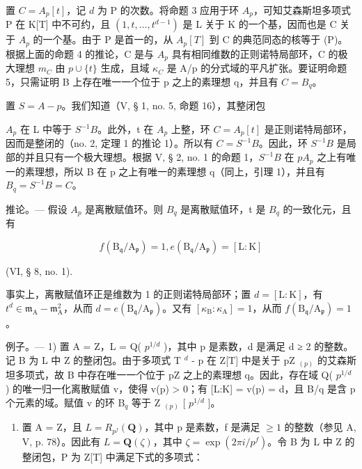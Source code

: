 置 \(C = A_{p}[t]\)，记 \(d\) 为 P 的次数。将命题 3 应用于环 \(A_{p}\)，可知艾森斯坦多项式 P 在 K{[}T{]} 中不可约，且 \((1, t, ..., t^{d-1})\) 是 L 关于 K 的一个基，因而也是 C 关于 \(A_{p}\) 的一个基。由于 P 是首一的，从 \(A_{p}[T]\) 到 C 的典范同态的核等于 (P)。根据上面的命题 4 的推论，C 是与 \(A_{p}\) 具有相同维数的正则诺特局部环，C 的极大理想 \(m_{C}\) 由 \(p \cup \{t\}\) 生成，且域 \(\kappa_{C}\) 是 A/p 的分式域的平凡扩张。要证明命题 5，只需证明 B 上存在唯一一个位于 p 之上的素理想 q，并且有 \(C = B_{q}\)。

置 \(S = A - p\)。我们知道（V, § 1, no. 5, 命题 16），其整闭包

\(A_{p}\) 在 L 中等于 \(S^{-1}B\)。此外，t 在 \(A_{p}\) 上整，环 \(C = A_{p}[t]\) 是正则诺特局部环，因而是整闭的（no. 2, 定理 1 的推论 1）。所以有 \(C = S^{-1}B\)。因此，环 \(S^{-1}B\) 是局部的并且只有一个极大理想。根据 V, § 2, no. 1 的命题 1，\(S^{-1}B\) 在 \(pA_{p}\) 之上有唯一的素理想，所以 B 在 p 之上有唯一的素理想 q（同上，引理 1），并且有 \(B_{q} = S^{-1}B = C\)。

推论。--- 假设 \(A_{p}\) 是离散赋值环。则 \(B_{q}\) 是离散赋值环，t 是 \(B_{q}\) 的一致化元，且有

\[
f (\mathrm{B} _ {\mathfrak {q}} / \mathrm{A} _ {\mathfrak {p}}) = 1, e (\mathrm{B} _ {\mathfrak {q}} / \mathrm{A} _ {\mathfrak {p}}) = [ \mathrm{L}: \mathrm{K} ]\tag{9}
\]

(VI, § 8, no. 1).

事实上，离散赋值环正是维数为 1 的正则诺特局部环；置 \(d = [\mathrm{L}:\mathrm{K}]\)，有 \(t^{d}\in\mathfrak{m}_{\mathrm{A}}-\mathfrak{m}_{\mathrm{A}}^{2}\)，从而 \(d=e(\mathrm{B}_{\mathfrak{q}}/\mathrm{A}_{\mathfrak{p}})\)。又有 \([\kappa_{\mathrm{B}}:\kappa_{\mathrm{A}}]=1\)，从而 \(f(\mathrm{B}_{\mathfrak{q}}/\mathrm{A}_{\mathfrak{p}})=1\)。

例子。--- 1) 置 A = Z，L = Q( \(p^{1/d}\) )，其中 p 是素数，d 是满足 d ≥ 2 的整数。记 B 为 L 中 Z 的整闭包。由于多项式 T \(^{d}\) - p 在 Z{[}T{]} 中是关于 pZ \(_{(p)}\) 的艾森斯坦多项式，故 B 中存在唯一一个位于 pZ 之上的素理想 q。因此，存在域 Q( \(p^{1/d}\) ) 的唯一归一化离散赋值 v，使得 v(p) \textgreater{} 0；有 {[}L:K{]} = v(p) = d，且 B/q 是含 p 个元素的域。赋值 v 的环 B\(_{q}\) 等于 Z \(_{(p)}\) {[} \(p^{1/d}\) {]}。

\begin{enumerate}
\def\labelenumi{\arabic{enumi})}
\setcounter{enumi}{1}
\tightlist
\item
  置 A = Z，且 \(L = R_{p^{f}}(\mathbf{Q})\)，其中 p 是素数，f 是满足 \(\geqslant 1\) 的整数（参见 A, V, p. 78）。因此有 \(L = \mathbf{Q}(\zeta)\)，其中 \(\zeta = \exp(2\pi i/p^{f})\)。令 B 为 L 中 Z 的整闭包，P 为 Z{[}T{]} 中满足下式的多项式：
\end{enumerate}

